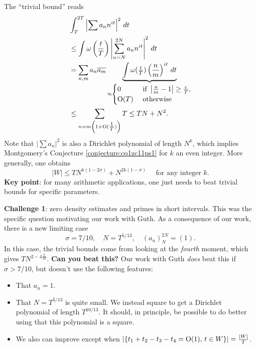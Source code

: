 \documentclass[reqno]{amsart} 
\numberwithin{theorem}{section}
\numberwithin{equation}{section}
\begin{document}
The ``trivial bound'' reads
\begin{align*}
  &\int_T^{2 T} \left\lvert \sum a_n n^{i t} \right\rvert^2 \, d t
  \\
  &\leq \int \omega \left( \frac{t}{T} \right)
    \left\lvert \sum_{n = N}^{2 N} a_n n^{i t} \right\rvert^2 \, d t \\
  &= \sum_{n, m} a_n \overline{a_m} \underbrace
    {
    \int \omega(\tfrac{t}{T}) \left( \frac{n}{m} \right)^{i t} \, d t
    }_{
    \approx
    \begin{cases}
      0
      & \text{ if }       \left\lvert \tfrac{n}{m} - 1 \right\rvert \geq \tfrac{c}{T}, \\
      \operatorname{O}(T)
      & \text{ otherwise}
    \end{cases}
    } \\
  &\leq \sum_{n = m \left( 1 + \operatorname{O}(\tfrac{1}{T}) \right)} T
    \leq T N + N^2.
\end{align*}
Note that $\left\lvert \sum a_n \right\rvert^2$ is also a Dirichlet polynomial of length $N^k$, which implies Montgomery's Conjecture \ref{conjecture:cq1zc11ps1} for $k$ an even integer.  More generally, one obtains
\begin{equation*}
  \lvert W \rvert \leq T N^{k(1 - 2 \sigma)} + N^{2 k(1 - \sigma)}
  \quad \text{ for any integer } k.
\end{equation*}
\textbf{Key point}: for many arithmetic applications, one just needs to beat trivial bounds for specific parameters.

\textbf{Challenge 1}: zero density estimates and primes in short intervals.  This was the specific question motivating our work with Guth.  As a consequence of our work, there is a new limiting case
\begin{equation*}
  \sigma = 7/10, \quad N = T^{5/13},
  \quad(a_n)_N^{2 N} = (1).
\end{equation*}
In this case, the trivial bounds come from looking at the \emph{fourth} moment, which gives $T N^{2 - 4 \frac{7}{10}}$.  \textbf{Can you beat this?}  Our work with Guth \emph{does} beat this if $\sigma > 7/10$, but doesn't use the following features:
\begin{itemize}
\item That $a_n = 1$.
\item That $N = T^{5/13}$ is quite small.  We instead square to get a Dirichlet polynomial of length $T^{10/13}$.  It should, in principle, be possible to do better using that this polynomial is a square.
\item We also can improve except when $\left\lvert \{t_1 + t_2 - t_3 - t_4 = \operatorname{O}(1), \, t \in W\} \right\rvert = \frac{\lvert W \rvert}{T}$.
\end{itemize}
\end{document}
